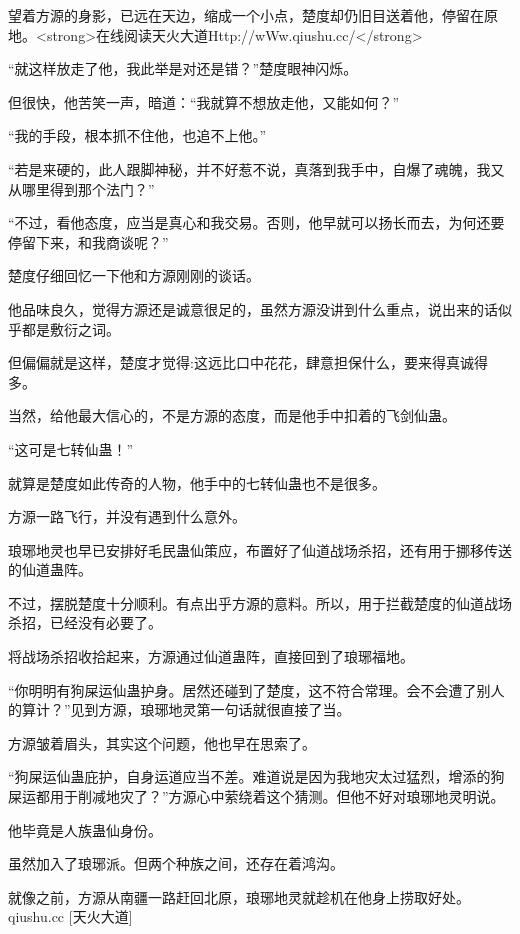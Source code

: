 
\begin{this_body}

望着方源的身影，已远在天边，缩成一个小点，楚度却仍旧目送着他，停留在原地。<strong>在线阅读天火大道Http://wWw.qiushu.cc/</strong>

“就这样放走了他，我此举是对还是错？”楚度眼神闪烁。

但很快，他苦笑一声，暗道：“我就算不想放走他，又能如何？”

“我的手段，根本抓不住他，也追不上他。”

“若是来硬的，此人跟脚神秘，并不好惹不说，真落到我手中，自爆了魂魄，我又从哪里得到那个法门？”

“不过，看他态度，应当是真心和我交易。否则，他早就可以扬长而去，为何还要停留下来，和我商谈呢？”

楚度仔细回忆一下他和方源刚刚的谈话。

他品味良久，觉得方源还是诚意很足的，虽然方源没讲到什么重点，说出来的话似乎都是敷衍之词。

但偏偏就是这样，楚度才觉得:这远比口中花花，肆意担保什么，要来得真诚得多。

当然，给他最大信心的，不是方源的态度，而是他手中扣着的飞剑仙蛊。

“这可是七转仙蛊！”

就算是楚度如此传奇的人物，他手中的七转仙蛊也不是很多。

方源一路飞行，并没有遇到什么意外。

琅琊地灵也早已安排好毛民蛊仙策应，布置好了仙道战场杀招，还有用于挪移传送的仙道蛊阵。

不过，摆脱楚度十分顺利。有点出乎方源的意料。所以，用于拦截楚度的仙道战场杀招，已经没有必要了。

将战场杀招收拾起来，方源通过仙道蛊阵，直接回到了琅琊福地。

“你明明有狗屎运仙蛊护身。居然还碰到了楚度，这不符合常理。会不会遭了别人的算计？”见到方源，琅琊地灵第一句话就很直接了当。

方源皱着眉头，其实这个问题，他也早在思索了。

“狗屎运仙蛊庇护，自身运道应当不差。难道说是因为我地灾太过猛烈，增添的狗屎运都用于削减地灾了？”方源心中萦绕着这个猜测。但他不好对琅琊地灵明说。

他毕竟是人族蛊仙身份。

虽然加入了琅琊派。但两个种族之间，还存在着鸿沟。

就像之前，方源从南疆一路赶回北原，琅琊地灵就趁机在他身上捞取好处。qiushu.cc [天火大道]


\end{this_body}
